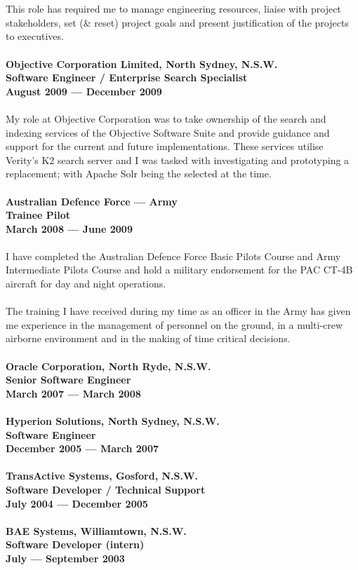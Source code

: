 \documentclass[a4paper]{article}
\begin{document}
\\\\
This role has required me to manage engineering resources, liaise with project stakeholders, set (\& reset) project goals and present justification of the projects to executives.
\\\\
\textbf{Objective Corporation Limited, North Sydney, N.S.W.\\Software Engineer / Enterprise Search Specialist\\August 2009 --- December 2009}\\\\
My role at Objective Corporation was to take ownership of the search and indexing services of the Objective Software Suite and provide guidance and support for the current and future implementations. These services utilise Verity's K2 search server and I was tasked with investigating and prototyping a replacement; with Apache Solr being the selected at the time.\\\\
\textbf{Australian Defence Force --- Army\\Trainee Pilot\\March 2008 --- June 2009}\\\\
I have completed the Australian Defence Force Basic Pilots Course and Army Intermediate Pilots Course and hold a military endorsement for the PAC CT-4B aircraft for day and night operations.\\\\
The training I have received during my time as an officer in the Army has given me experience in the management of personnel on the ground, in a multi-crew airborne environment and in the making of time critical decisions.\\\\
\textbf{Oracle Corporation, North Ryde, N.S.W.\\Senior Software Engineer\\March 2007 --- March 2008}\\\\
\textbf{Hyperion Solutions, North Sydney, N.S.W.\\Software Engineer\\December 2005 --- March 2007} \\\\
\textbf{TransActive Systems, Gosford, N.S.W.\\Software Developer / Technical Support\\July 2004 --- December 2005}\\\\
\textbf{BAE Systems, Williamtown, N.S.W.\\Software Developer (intern)\\July --- September 2003}
\pagebreak
\ryanHeaderSmall
\end{document}
